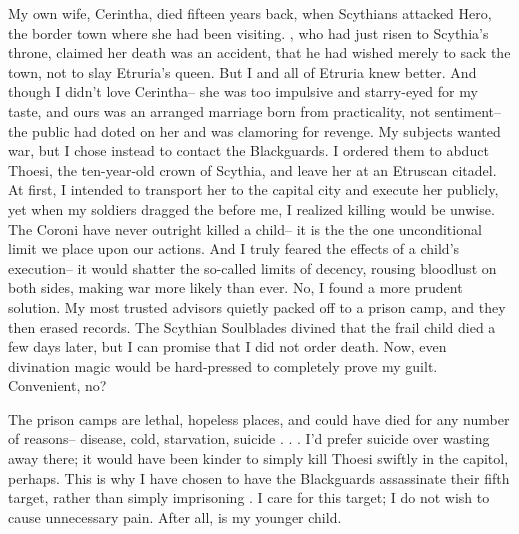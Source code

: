 \documentclass[char]{Kos}
\begin{document}
My own wife, Cerintha, died fifteen years back, when Scythians attacked Hero, the border town where she had been visiting. \cScythiaKing{\Monarch} \cScythiaKing{}, who had just risen to Scythia's throne, claimed her death was an accident, that he had wished merely to sack the town, not to slay Etruria's queen. But I and all of Etruria knew better. And though I didn't love Cerintha-- she was too impulsive and starry-eyed for my taste, and ours was an arranged marriage born from practicality, not sentiment-- the public had doted on her and was clamoring for revenge. My subjects wanted war, but I chose instead to contact the Blackguards. I ordered them to abduct Thoesi, the ten-year-old crown \cFugitive{\prince} of Scythia, and leave her at an Etruscan citadel. At first, I intended to transport her to the capital city and execute her publicly, yet when my soldiers dragged the \cFugitive{\kid} before me, I realized killing \cFugitive{\them} would be unwise. The Coroni have never outright killed a child-- it is the the one unconditional limit we place upon our actions. And I truly feared the effects of a child's execution-- it would shatter the so-called limits of decency, rousing bloodlust on both sides, making war more likely than ever. No, I found a more prudent solution. My most trusted advisors quietly packed \cFugitive{\them} off to a prison camp, and they then erased \cFugitive{\their} records. The Scythian Soulblades divined that the frail child died a few days later, but I can promise that I did not order \cFugitive{\their} death. Now, even divination magic would be hard-pressed to completely prove my guilt. Convenient, no?

The prison camps are lethal, hopeless places, and \cFugitive{\they} could have died for any number of reasons-- disease, cold, starvation, suicide . . . I'd prefer suicide over wasting away there; it would have been kinder to simply kill Thoesi swiftly in the capitol, perhaps. This is why I have chosen to have the Blackguards assassinate their fifth target, rather than simply imprisoning \cPoet{\them}. I care for this target; I do not wish to cause \cPoet{\them} unnecessary pain. After all, \cPoet{\they} is my younger child.
\end{document}

